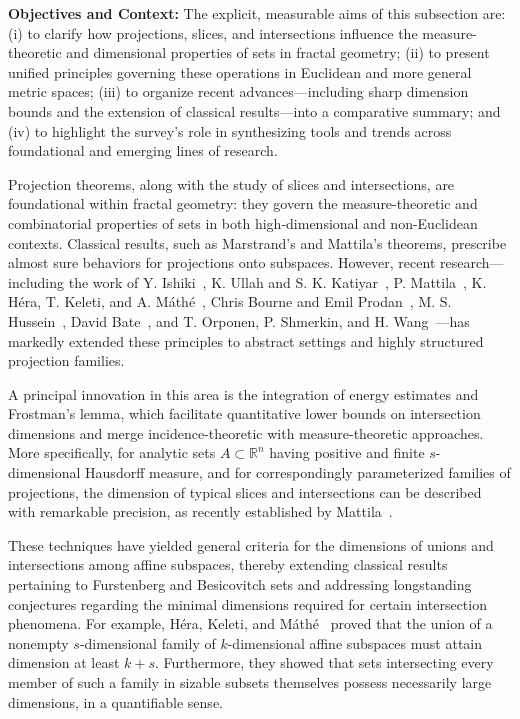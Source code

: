 \documentclass[sigconf]{acmart}
\begin{document}
\textbf{Objectives and Context:} The explicit, measurable aims of this subsection are: (i) to clarify how projections, slices, and intersections influence the measure-theoretic and dimensional properties of sets in fractal geometry; (ii) to present unified principles governing these operations in Euclidean and more general metric spaces; (iii) to organize recent advances—including sharp dimension bounds and the extension of classical results—into a comparative summary; and (iv) to highlight the survey’s role in synthesizing tools and trends across foundational and emerging lines of research.

Projection theorems, along with the study of slices and intersections, are foundational within fractal geometry: they govern the measure-theoretic and combinatorial properties of sets in both high-dimensional and non-Euclidean contexts. Classical results, such as Marstrand’s and Mattila’s theorems, prescribe almost sure behaviors for projections onto subspaces. However, recent research—including the work of Y. Ishiki~\cite{ref1}, K. Ullah and S. K. Katiyar~\cite{ref6}, P. Mattila~\cite{ref74}, K. Héra, T. Keleti, and A. Máthé~\cite{ref75}, Chris Bourne and Emil Prodan~\cite{ref23}, M. S. Hussein~\cite{ref30}, David Bate~\cite{ref43}, and T. Orponen, P. Shmerkin, and H. Wang~\cite{ref92}—has markedly extended these principles to abstract settings and highly structured projection families.

A principal innovation in this area is the integration of energy estimates and Frostman's lemma, which facilitate quantitative lower bounds on intersection dimensions and merge incidence-theoretic with measure-theoretic approaches. More specifically, for analytic sets $A\subset\mathbb{R}^n$ having positive and finite $s$-dimensional Hausdorff measure, and for correspondingly parameterized families of projections, the dimension of typical slices and intersections can be described with remarkable precision, as recently established by Mattila~\cite{ref74}. 

These techniques have yielded general criteria for the dimensions of unions and intersections among affine subspaces, thereby extending classical results pertaining to Furstenberg and Besicovitch sets and addressing longstanding conjectures regarding the minimal dimensions required for certain intersection phenomena. For example, Héra, Keleti, and Máthé~\cite{ref75} proved that the union of a nonempty $s$-dimensional family of $k$-dimensional affine subspaces must attain dimension at least $k+s$. Furthermore, they showed that sets intersecting every member of such a family in sizable subsets themselves possess necessarily large dimensions, in a quantifiable sense.
\end{document}
